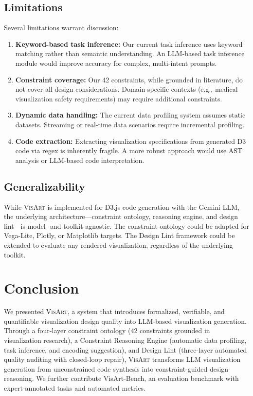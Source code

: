 \documentclass[journal]{vgtc}
\newcommand{\sysname}{\textsc{VisArt}}
\newcommand{\eg}{e.g.}
\begin{document}
\subsection{Limitations}

Several limitations warrant discussion:
\begin{enumerate}
\item \textbf{Keyword-based task inference:} Our current task inference uses keyword matching rather than semantic understanding.
An LLM-based task inference module would improve accuracy for complex, multi-intent prompts.
\item \textbf{Constraint coverage:} Our 42 constraints, while grounded in literature, do not cover all design considerations.
Domain-specific contexts (\eg{}, medical visualization safety requirements) may require additional constraints.
\item \textbf{Dynamic data handling:} The current data profiling system assumes static datasets.
Streaming or real-time data scenarios require incremental profiling.
\item \textbf{Code extraction:} Extracting visualization specifications from generated D3 code via regex is inherently fragile.
A more robust approach would use AST analysis or LLM-based code interpretation.
\end{enumerate}

\subsection{Generalizability}

While \sysname{} is implemented for D3.js code generation with the Gemini LLM, the underlying architecture—constraint ontology, reasoning engine, and design lint—is model- and toolkit-agnostic.
The constraint ontology could be adapted for Vega-Lite, Plotly, or Matplotlib targets.
The Design Lint framework could be extended to evaluate any rendered visualization, regardless of the underlying toolkit.

\section{Conclusion}

We presented \sysname{}, a system that introduces formalized, verifiable, and quantifiable visualization design quality into LLM-based visualization generation.
Through a four-layer constraint ontology (42 constraints grounded in visualization research), a Constraint Reasoning Engine (automatic data profiling, task inference, and encoding suggestion), and Design Lint (three-layer automated quality auditing with closed-loop repair), \sysname{} transforms LLM visualization generation from unconstrained code synthesis into constraint-guided design reasoning.
We further contribute VisArt-Bench, an evaluation benchmark with expert-annotated tasks and automated metrics.
\end{document}
